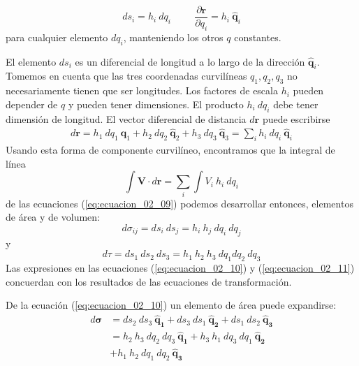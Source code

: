 \begin{equation}
ds_{i} = h_{i} \: dq_{i} \hspace{1cm} \dfrac{\partial \mathbf{r}}{\partial q_{i}} = h_{i} \: \mathbf{\widehat{q}}_{i} 
\label{eq:ecuacion_02_09}
\end{equation}
para cualquier elemento $dq_{i}$, manteniendo los otros $q$ constantes.
\par
El elemento $ds_{i}$ es un diferencial de longitud a lo largo de la dirección $\mathbf{\widehat{q}}_{i}$. Tomemos en cuenta que las tres coordenadas curvilíneas $q_{1},q_{2},q_{3}$ no necesariamente tienen  que ser longitudes. Los factores de escala $h_{i}$ pueden depender de $q$ y pueden tener dimensiones. El producto $h_{i} \: dq_{i}$ debe tener dimensión de longitud. El vector diferencial de distancia $d\mathbf{r}$ puede escribirse
\begin{align*} 
d \mathbf{r} =  h_{1} \: dq_{1} \: \mathbf{\widehat{q}}_{1} + h_{2} \: dq_{2} \: \mathbf{\widehat{q}}_{2} + h_{3} \: dq_{3} \: \mathbf{\widehat{q}}_{3} = \sum_{i} h_{i} \: dq_{i} \: \mathbf{\widehat{q}}_{i}
\end{align*}
Usando esta forma de componente curvilíneo, encontramos que la integral de línea
\[ \int \mathbf{V} \cdot d \mathbf{r} = \sum_{i} \int V_{i} \: h_{i} \: dq_{i}  \]
de las ecuaciones (\ref{eq:ecuacion_02_09}) podemos desarrollar entonces, elementos de área y de volumen:
\begin{equation}
d \sigma_{ij} = ds_{i} \: ds_{j} =  h_{i} \: h_{j} \: dq_{i} \: dq_{j}
\label{eq:ecuacion_02_10}
\end{equation}
y
\begin{equation}
d \tau = ds_{1} \: ds_{2} \: ds_{3} =  h_{1} \: h_{2} \: h_{3} \: dq_{1} dq_{2} \: dq_{3}
\label{eq:ecuacion_02_11}
\end{equation}
Las expresiones en las ecuaciones (\ref{eq:ecuacion_02_10}) y (\ref{eq:ecuacion_02_11}) concuerdan con los resultados de las ecuaciones de transformación.
\par
De la ecuación (\ref{eq:ecuacion_02_10}) un elemento de área puede expandirse:
\begin{align*}
d \bm{\sigma} &= ds_{2} \: ds_{3} \: \mathbf{\widehat{q}_{1}} + ds_{3} \: ds_{1} \: \mathbf{\widehat{q}_{2}} + ds_{1} \: ds_{2} \: \mathbf{\widehat{q}_{3}} \\
&= h_{2} \: h_{3} \: d q_{2} \: d q_{3} \: \mathbf{\widehat{q}_{1}} + h_{3} \: h_{1} \: d q_{3} \: d q_{1} \: \mathbf{\widehat{q}_{2}} \\
&+ h_{1} \: h_{2} \: d q_{1} \: d q_{2} \: \mathbf{\widehat{q}_{3}}
\end{align*}
